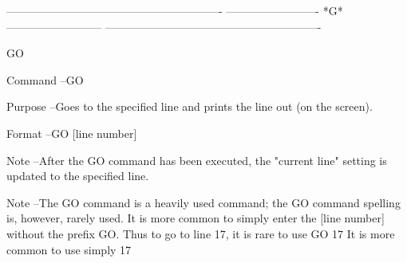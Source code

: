  
 
 
 
 
 
 
 
 
 
 
 
 
 
 
 
 
 
 
 
 
 
 
 
 
 
 
 
 
 
 
 
 
 
 
 
 
 
 
 
 
 
 
 
 
 
 
 
 
 
 
 
 
 
 
 
 
 
 
 
 
 
 
 
 
 
 
 
 
 
 
 
 
 
----------------------------------------------------------
-------------------------  *G*  --------------------------
----------------------------------------------------------
 
GO
 
Command --GO
 
Purpose --Goes to the specified line and
          prints the line out (on the screen).
 
Format  --GO     [line number]
 
Note    --After the GO command has been executed,
          the "current line" setting is updated
          to the specified line.
 
Note    --The GO command is a heavily used command;
          the GO command spelling is, however, rarely
          used.  It is more common to simply enter the
          [line number]     without the prefix GO.
          Thus to go to line 17, it is rare to use
             GO 17
          It is more common to use simply
             17
 
